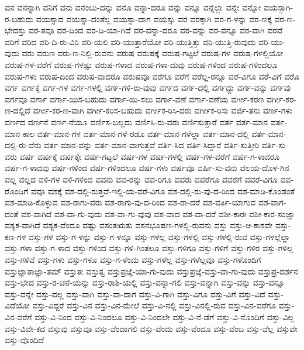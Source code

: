 {ವನ
ವನನ್ನಾಗಿ
ವನಿಗೆ
ವನು
ವನೆಂಬು-ದನ್ನು
ವನೊ
ವನ್ನಾ-ದರೂ
ವನ್ನು
ವನ್ನೂ
ವನ್ನೆಲ್ಲಾ
ವನ್ನೇ
ವನ್ನೋ
ವಯಸ್ಸಾಗಿ-ರ-ಬಹುದು
ವಯಸ್ಸಾದ
ವಯಸ್ಸಾ-ದಂತೆಲ್ಲ
ವಯಸ್ಸಾ-ದಾಗ
ವಯಸ್ಸು
ವರ
ವರಕ್ಕಾಗಿ
ವರ-ಗ-ಳನ್ನು
ವರ-ಣಕ್ಕೆ
ವರ-ಣ-ಭೇದಸ್ತು
ವರ-ತವೂ
ವರ-ದಿಂದ
ವರ-ದಿ-ಯಾ-ಗಿದೆ
ವರ-ವನ್ನಾ-ದರೂ
ವರ-ವನ್ನು
ವರ-ವನ್ನೂ
ವರ-ವಾಗಿ
ವರವೆ
ವರಿಗೆ
ವರಿದ
ವರಿ-ದಿ-ರು-ವಿರಿ
ವರಿ-ಯಲಿ
ವರಿ-ಯುತ್ತಾರೆಯೋ
ವರಿ-ಯುತ್ತಿತ್ತು
ವರಿ-ಯುತ್ತಿ-ರುವುದು
ವರಿ-ಯು-ವುದು
ವರು
ವರುಣ
ವರು-ಣ-ನಿಲ್ಲಿ-ರುವನು
ವರುಷ
ವರುಷಕ್ಕೆ
ವರುಷ-ಗಟ್ಟಲೆ
ವರುಷ-ಗಳ
ವರುಷ-ಗಳಲ್ಲಿಯೋ
ವರುಷ-ಗಳ-ವರೆಗೆ
ವರುಷ-ಗಳಷ್ಟು
ವರುಷ-ಗಳಾದ
ವರುಷ-ಗಳಾ-ದುವು
ವರುಷ-ಗಳಿಂದ
ವರುಷ-ಗಳಿಂದಲೂ
ವರುಷ-ಗಳು
ವರುಷ-ದಿಂದ
ವರುಷ-ವಾದರೂ
ವರುಷವೂ
ವರೆಗೂ
ವರೆಗೆ
ವರೆಲ್ಲ-ರನ್ನೂ
ವರೆ-ವಿಗೂ
ವರೆ-ವಿಗೆ
ವರೊ
ವರ್ಗ
ವರ್ಗಕ್ಕೆ
ವರ್ಗ-ಗಳ
ವರ್ಗ-ಗಳಲ್ಲಿ
ವರ್ಗ-ಗಳಿ-ರು-ವುವು
ವರ್ಗದ
ವರ್ಗ-ದಲ್ಲಿ
ವರ್ಗದ್ದು
ವರ್ಗ-ವನ್ನು
ವರ್ಗವು
ವರ್ಗವೂ
ವರ್ಗಾ
ವರ್ಗಾ-ಯಿಸ-ಬಹುದು
ವರ್ಗಾ-ಯಿ-ಸಲು
ವರ್ಗಾ-ವಣೆ
ವರ್ಗಾ-ವಣೆಯ
ವರ್ಗೀ-ಕರಣ
ವರ್ಗೀ-ಕರ-ಣ-ದಲ್ಲಿದೆ
ವರ್ಗೀ-ಕರ-ಣ-ವಾಗಿ
ವರ್ಗೀ-ಕರಿಸ-ಬಹುದು
ವರ್ಗೀಕ-ರಿಸಿ-ದರು
ವರ್ಗೀಕ-ರಿಸು
ವರ್ಜಿ-ತನು
ವರ್ಣ-ಗಳು
ವರ್ಣದ
ವರ್ಣನೆ
ವರ್ಣ-ನೆಯೂ
ವರ್ಣಿಸ-ಬಲ್ಲದು
ವರ್ಣಿಸಿ-ರು-ವರು
ವರ್ಣಿಸುತ್ತಾರೆ
ವರ್ತ
ವರ್ತ-ಮಾನ
ವರ್ತ-ಮಾನ-ಕಾಲ
ವರ್ತ-ಮಾನ-ಗಳ
ವರ್ತ-ಮಾನ-ಗಳೆ-ರಡೂ
ವರ್ತ-ಮಾನ-ಗಳೆಲ್ಲಾ
ವರ್ತ-ಮಾನ-ದಲ್ಲಿ
ವರ್ತ-ಮಾನ-ದಲ್ಲಿ-ರು-ವೆನು
ವರ್ತ-ಮಾನ-ವನ್ನು
ವರ್ತ-ಮಾನ-ವಾಗುತ್ತವೆ
ವರ್ತಿ-ಸಿದ
ವರ್ತಿ-ಸಿದ್ದಾರೆ
ವರ್ತಿ-ಸುತ್ತೀರಿ
ವರ್ತಿ-ಸು-ವರು
ವರ್ಷ
ವರ್ಷಕ್ಕೆ
ವರ್ಷಕ್ಕೇ
ವರ್ಷ-ಗಟ್ಟಲೆ
ವರ್ಷ-ಗಳ
ವರ್ಷ-ಗಳಲ್ಲಿ
ವರ್ಷ-ಗಳ-ವರೆಗೆ
ವರ್ಷ-ಗ-ಳಾದರೂ
ವರ್ಷ-ಗ-ಳಾದವು
ವರ್ಷ-ಗಳಿಂದ
ವರ್ಷ-ಗಳಿಂದಲೂ
ವರ್ಷ-ಗಳು
ವರ್ಷವೂ
ವರ್ಷಿ-ಸು-ವನು
ವಲಯ-ದೊಳ-ಗಿನ
ವಲ್ಲ
ವಲ್ಲದ
ವಳಿ-ಗಳ
ವಳಿ-ಗಳಿಂದ
ವವನು
ವವ-ರನ್ನು
ವವ-ರಿಗೂ
ವವರು
ವವರೆಗೂ
ವವರೆಗೆ
ವವರೆ-ವಿಗೂ
ವವ-ರೊಂದಿಗೆ
ವವೂ
ವಶಕ್ಕೆ
ವಶ-ದಲ್ಲಿ-ರುತ್ತವೆ-ಇಲ್ಲಿ-ಯ-ವರೆ-ವಿಗೂ
ವಶ-ದಲ್ಲಿ-ರು-ವು-ದ-ರಿಂದ
ವಶ-ಮಾಡಿ-ಕೊಂಡಂತೆ
ವಶ-ಮಾಡಿ-ಕೊಳ್ಳುವ
ವಶ-ರಾಗು-ವರು
ವಶ-ರಾಗು-ವು-ದ-ರಿಂದ
ವಶ-ರಾ-ದರೆ
ವಶ-ವರ್ತಿ-ಯಾಗುವ
ವಶ-ವಾಗ-ದಂತೆ
ವಶ-ವಾಗಿದೆ
ವಶ-ವಾ-ಗು-ವುದು
ವಶ-ವಾ-ಗು-ವುವು
ವಶ-ವಾದ
ವಶ-ವಾ-ದರೆ
ವಶೀ-ಕಾರಃ
ವಶೀ-ಕಾರ-ಸಂಜ್ಞಾ
ವಶ್ಯಕ-ವಾಗಿದೆ
ವಶ್ಯಕ-ವೆಂದೂ
ವಷ್ಟು
ವಸಂತಋತು
ವಸನಭೂಷಣ-ಗಳಲ್ಲಿ-ರುವನು
ವಸ್ತು
ವಸ್ತು-ಆ-ಕಾಶವೇ
ವಸ್ತು-ಕಣ-ಗಳ
ವಸ್ತು-ಗಳ
ವಸ್ತು-ಗ-ಳನ್ನು
ವಸ್ತು-ಗ-ಳನ್ನೂ
ವಸ್ತು-ಗಳಲ್ಲ
ವಸ್ತು-ಗಳಲ್ಲಿ
ವಸ್ತು-ಗಳಲ್ಲಿ-ರುವ
ವಸ್ತು-ಗಳಲ್ಲೆಲ್ಲಾ
ವಸ್ತು-ಗಳಾ
ವಸ್ತು-ಗ-ಳಾದ
ವಸ್ತು-ಗಳಿಂದ
ವಸ್ತು-ಗಳಿ-ಗಿಂತಲೂ
ವಸ್ತು-ಗಳಿಗೂ
ವಸ್ತು-ಗಳಿಗೆ
ವಸ್ತು-ಗಳಿರ
ವಸ್ತು-ಗಳಿಲ್ಲ
ವಸ್ತು-ಗಳಿವೆ
ವಸ್ತು-ಗಳು
ವಸ್ತು-ಗಳೂ
ವಸ್ತು-ಗ-ಳೆಂದು
ವಸ್ತು-ಗಳೆಲ್ಲ
ವಸ್ತು-ಗಳೆಲ್ಲವೂ
ವಸ್ತು-ಗಳೊಂದಿಗೆ
ವಸ್ತುಜ್ಞಾತಾಜ್ಞಾ-ತಮ್
ವಸ್ತುತಃ
ವಸ್ತುತ್ವ
ವಸ್ತುಪ್ರಜ್ಞೆ-ಯಾ-ಗು-ವುದು
ವಸ್ತುಪ್ರಜ್ಞೆ-ವಸ್ತು-ವಾ-ಗು-ವುದು
ವಸ್ತುಪ್ರ-ದರ್ಶನ
ವಸ್ತು-ಭೇದ
ವಸ್ತು-ರ-ಚನೆ-ಯನ್ನು
ವಸ್ತು-ರಾಶಿ-ಯಲ್ಲಿ
ವಸ್ತು-ವನ್ನಾ-ಗಲಿ
ವಸ್ತು-ವನ್ನಾಗಿ
ವಸ್ತು-ವನ್ನು
ವಸ್ತು-ವನ್ನೂ
ವಸ್ತು-ವನ್ನೇ
ವಸ್ತು-ವಲ್ಲ
ವಸ್ತು-ವಾಗಿ
ವಸ್ತು-ವಾ-ದಾಗ
ವಸ್ತು-ವಿ-ಗಾಗಿ
ವಸ್ತು-ವಿಗೂ
ವಸ್ತು-ವಿಗೆ
ವಸ್ತು-ವಿದೆ
ವಸ್ತು-ವಿದೆಯೋ
ವಸ್ತು-ವಿದ್ದರೆ
ವಸ್ತು-ವಿನ
ವಸ್ತು-ವಿನ-ಮೇಲೆ
ವಸ್ತು-ವಿ-ನಲ್ಲಿ
ವಸ್ತು-ವಿನಲ್ಲಿ-ರುವ
ವಸ್ತು-ವಿನ-ವರೆಗೂ
ವಸ್ತು-ವಿನ-ವರೆಗೆ
ವಸ್ತು-ವಿ-ನಿಂದ
ವಸ್ತು-ವಿ-ನಿಂದಲೂ
ವಸ್ತು-ವಿ-ನಿಂದಲೇ
ವಸ್ತು-ವಿ-ನೆ-ಡೆಗೆ
ವಸ್ತು-ವಿ-ನೊಂದಿಗೆ
ವಸ್ತು-ವಿಲ್ಲ
ವಸ್ತು-ವಿವೇ-ಕದ
ವಸ್ತುವು
ವಸ್ತುವೂ
ವಸ್ತು-ವೆಂದಾಗಲಿ
ವಸ್ತು-ವೆಂದು
ವಸ್ತು-ವೆಂದೂ
ವಸ್ತು-ವೆಂಬ
ವಸ್ತು-ವೆಲ್ಲ
ವಸ್ತುವೇ
ವಸ್ತು-ವೊಂದಿದೆ
}
